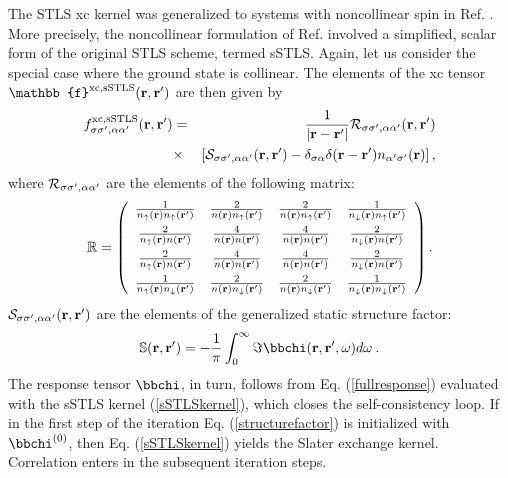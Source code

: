 \documentclass[aps,prb,twocolumn,superscriptaddress]{revtex4-2}
\newcommand{\SC}{{\cal S}}
\newcommand{\bfr}{{\bf r}}
\newcommand{\ua}{\uparrow}
\newcommand{\da}{\downarrow}
\begin{document}
The STLS xc kernel \cite{Singwi1968,GiulianiVignale} was generalized to systems
with noncollinear spin in Ref. \cite{Ullrich2018}. More precisely, the noncollinear formulation of Ref. \cite{Ullrich2018} involved a simplified, scalar form
of the original STLS scheme, termed sSTLS. Again, let us consider the special case where the ground state is collinear.
The elements of the xc tensor $\mathbb{f}^{\rm xc,sSTLS}(\bfr,\bfr')$ are then given by
\begin{eqnarray}\label{sSTLSkernel}
f^{\rm xc,sSTLS}_{\sigma\sigma',\alpha\alpha'}(\bfr,\bfr')
&=&
\frac{1}{|\bfr - \bfr'|} {\cal R}_{\sigma\sigma',\alpha\alpha'}(\bfr,\bfr')\\
&\times&\left[
\SC_{\sigma\sigma',\alpha\alpha'}(\bfr,\bfr') - \delta_{\sigma\alpha}\delta(\bfr-\bfr') n_{\alpha'\sigma'}(\bfr)\right], \nonumber
\end{eqnarray}
where ${\cal R}_{\sigma\sigma',\alpha\alpha'}$ are the elements of the following matrix:
\begin{equation}
\mathbb{R} = \left( \begin{array}{cccc}
\frac{1}{n_\ua(\bfr) n_\ua(\bfr')} & \frac{2}{n(\bfr) n_\ua(\bfr')} & \frac{2}{n(\bfr) n_\ua(\bfr')}& \frac{1}{n_\da(\bfr) n_\ua(\bfr')}\\[2mm]
\frac{2}{n_\ua(\bfr) n(\bfr')}     & \frac{4}{n(\bfr) n(\bfr')}     & \frac{4}{n(\bfr) n(\bfr')}    & \frac{2}{n_\da(\bfr) n(\bfr')}\\[2mm]
\frac{2}{n_\ua(\bfr) n(\bfr')}     & \frac{4}{n(\bfr) n(\bfr')}     & \frac{4}{n(\bfr) n(\bfr')}    & \frac{2}{n_\da(\bfr) n(\bfr')}\\[2mm]
\frac{1}{n_\ua(\bfr) n_\da(\bfr')} & \frac{2}{n(\bfr) n_\da(\bfr')} & \frac{2}{n(\bfr) n_\da(\bfr')}& \frac{1}{n_\da(\bfr) n_\da(\bfr')}
\end{array}\right).
\end{equation}
$\SC_{\sigma\sigma',\alpha\alpha'}(\bfr,\bfr')$ are the elements of the generalized static structure factor:
\begin{equation}\label{structurefactor}
\mathbb{S}(\bfr,\bfr') = -\frac{1}{\pi}\int_0^\infty \Im \mathbb{\bbchi}(\bfr,\bfr',\omega) d\omega \:.
\end{equation}
The response tensor $\mathbb{\bbchi}$, in turn, follows from Eq. (\ref{fullresponse}) evaluated with
the sSTLS kernel (\ref{sSTLSkernel}), which closes the self-consistency loop. If in the first step of the iteration  Eq. (\ref{structurefactor}) is initialized
with $\mathbb{\bbchi}^{(0)}$, then Eq. (\ref{sSTLSkernel}) yields the Slater exchange kernel. Correlation enters in the subsequent iteration steps.
\end{document}
